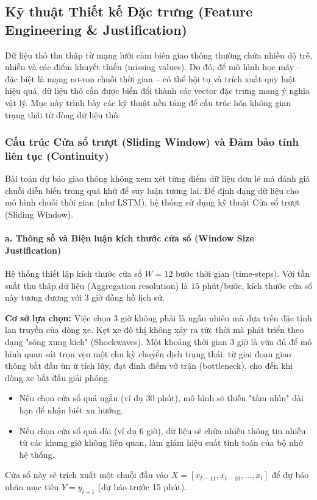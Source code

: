 \subsection{Kỹ thuật Thiết kế Đặc trưng (Feature Engineering \& Justification)}
\label{sec:5_2}

Dữ liệu thô thu thập từ mạng lưới cảm biến giao thông thường chứa nhiều độ trễ, nhiễu và các điểm khuyết thiếu (missing values). Do đó, để mô hình học máy – đặc biệt là mạng nơ-ron chuỗi thời gian – có thể hội tụ và trích xuất quy luật hiệu quả, dữ liệu thô cần được biến đổi thành các vector đặc trưng mang ý nghĩa vật lý. Mục này trình bày các kỹ thuật nền tảng để cấu trúc hóa không gian trạng thái từ dòng dữ liệu thô.

\subsubsection{Cấu trúc Cửa sổ trượt (Sliding Window) và Đảm bảo tính liên tục (Continuity)}

Bài toán dự báo giao thông không xem xét từng điểm dữ liệu đơn lẻ mà đánh giá chuỗi diễn biến trong quá khứ để suy luận tương lai. Để định dạng dữ liệu cho mô hình chuỗi thời gian (như LSTM), hệ thống sử dụng kỹ thuật Cửa sổ trượt (Sliding Window).

\paragraph{a. Thông số và Biện luận kích thước cửa sổ (Window Size Justification)}
Hệ thống thiết lập kích thước cửa sổ $W = 12$ bước thời gian (time-steps). Với tần suất thu thập dữ liệu (Aggregation resolution) là $15$ phút/bước, kích thước cửa sổ này tương đương với $3$ giờ đồng hồ lịch sử.

\textbf{Cơ sở lựa chọn:} Việc chọn $3$ giờ không phải là ngẫu nhiên mà dựa trên đặc tính lan truyền của dòng xe. Kẹt xe đô thị không xảy ra tức thời mà phát triển theo dạng "sóng xung kích" (Shockwaves). Một khoảng thời gian 3 giờ là vừa đủ để mô hình quan sát trọn vẹn một chu kỳ chuyển dịch trạng thái: từ giai đoạn giao thông bắt đầu ùn ứ tích lũy, đạt đỉnh điểm vỡ trận (bottleneck), cho đến khi dòng xe bắt đầu giải phóng.
\begin{itemize}
    \item Nếu chọn cửa sổ quá ngắn (ví dụ 30 phút), mô hình sẽ thiếu "tầm nhìn" dài hạn để nhận biết xu hướng.
    \item Nếu chọn cửa sổ quá dài (ví dụ 6 giờ), dữ liệu sẽ chứa nhiều thông tin nhiễu từ các khung giờ không liên quan, làm giảm hiệu suất tính toán của bộ nhớ hệ thống.
\end{itemize}
Cửa sổ này sẽ trích xuất một chuỗi đầu vào $X = [x_{t-11}, x_{t-10}, \dots, x_t]$ để dự báo nhãn mục tiêu $Y = y_{t+1}$ (dự báo trước 15 phút).

